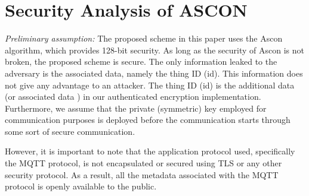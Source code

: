 
\section{Security Analysis of ASCON}
\textit{Preliminary assumption:} The proposed scheme in this paper uses the Ascon algorithm, which provides 128-bit security. As long as the security of Ascon is not broken, the proposed scheme is secure. The only information leaked to the adversary is the associated data, namely the thing ID (id). This information does not give any advantage to an attacker. The thing ID (id) is the additional data (or associated data ) in our authenticated encryption implementation. Furthermore, we assume that the private (symmetric) key employed for communication purposes is deployed before the communication starts through some sort of secure communication. 


However, it is important to note that the application protocol used, specifically the MQTT protocol, is not encapsulated or secured using TLS or any other security protocol. As a result, all the metadata associated with the MQTT protocol is openly available to the public.